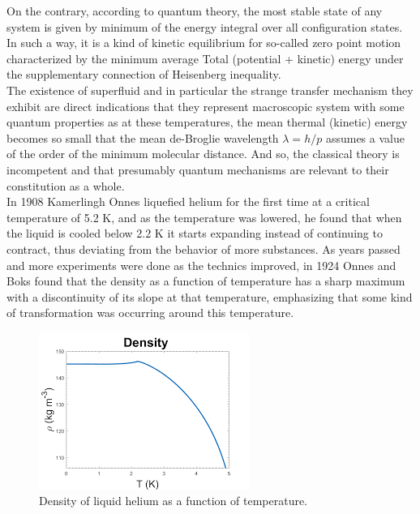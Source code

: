 \documentclass{article}
\begin{document}
On the contrary, according to quantum theory, the most stable state of any system is given by minimum of the energy integral over all configuration states. In such a way, it is a kind of kinetic equilibrium for so-called zero point motion characterized by the minimum average Total (potential + kinetic) energy under the supplementary connection of Heisenberg inequality.
\\

The existence of superfluid and in particular the strange transfer mechanism they exhibit are direct indications that they represent macroscopic system with some quantum properties as at these temperatures, the mean thermal (kinetic) energy becomes so small that the mean de-Broglie wavelength $\lambda = h/p$ assumes a value of the order of the minimum molecular distance. And so, the classical theory is incompetent and that presumably quantum mechanisms are relevant to their constitution as a whole.
\\

In 1908 Kamerlingh Onnes liquefied helium for the first time at a critical temperature of 5.2 K, and as the temperature was lowered, he found that when the liquid is cooled below 2.2 K it starts expanding instead of continuing to contract, thus deviating from the behavior of more substances.
As years passed and more experiments were done as the technics improved, in 1924 Onnes and Boks found that the density as a function of temperature has a sharp maximum with a discontinuity of its slope at that temperature, emphasizing that some kind of transformation was occurring around this temperature.
\\

\begin{figure}[H]
    \centering
    \includegraphics[width=0.62\linewidth]{Images/Density.png}
    \caption{Density of liquid helium as a function of temperature.}
    \label{fig:enter-label}
\end{figure}
\end{document}
